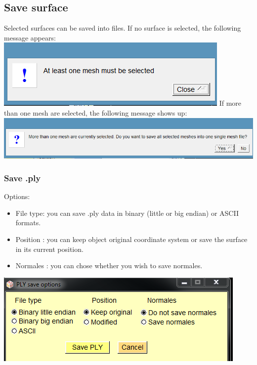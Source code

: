 \subsection{Save surface}
Selected surfaces can be saved into files. If no surface is selected, the following message appears:\\
\includegraphics[scale=0.5]{images/File/Save_message.png}
If more than one mesh are selected, the following message shows up:\\
\includegraphics[scale=0.5]{images/File/Save_message2.png}

\subsubsection{Save .ply}

\begin{minipage}{0.5\textwidth}
Options:
\begin{itemize}
\item File type: you can save .ply data in binary (little or big endian)
or ASCII formats.
\item Position : you can keep object original coordinate system or
save the surface in its current position.
\item Normales : you can chose whether you wish to save normales.
\end{itemize}

\end{minipage}    
\begin{minipage}{0.5\textwidth}\centering
  \includegraphics[scale=0.45]{images/File/Save_ply_new.png}
 \end{minipage} 

